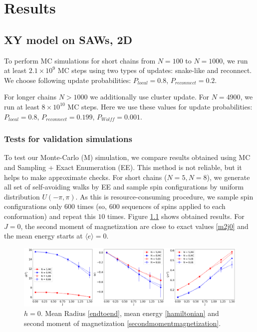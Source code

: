 \chapter{Results} \label{ch:results}
 
\section{XY model on SAWs, 2D}
To perform MC simulations for short chains from $N=100$ to $N=1000$, we run at least $2.1 \times 10^9$ MC steps using two  types of updates: snake-like and reconnect. We choose following update probabilities: $P_{local}=0.8$, $P_{reconnect}=0.2$. 

For longer chains $N>1000$ we additionally use cluster update. For $N=4900$, we run at least $8 \times 10^{10} $ MC steps. Here we use these values for update probabilities: $P_{local}=0.8$, $P_{reconnect}=0.199$, $P_{Wolff}=0.001$.

 
\subsection{Tests for validation simulations}
To test our Monte-Carlo (M) simulation, we compare results obtained using MC and Sampling + Exact Enumeration (EE). This method is not reliable, but it helps to make approximate checks. For short chains ($N=5, N=8$), we generate all set of self-avoiding walks by EE and sample spin configurations by uniform distribution $U(-\pi, \pi)$. As this is resource-consuming procedure, we sample spin configurations only $600$ times (so, 600 sequences of spins applied to each conformation) and repeat this $10$ times. Figure \ref{fig:ee} shows obtained results.  For $J=0$, the second moment of magnetization are close to exact values \eqref{m2j0} and the mean energy starts at $\langle e \rangle = 0$.

 \begin{figure}[H]
	\centering
	\includegraphics[scale=0.26]{Images/EE.png}
	\caption{$h=0$. Mean Radius \eqref{endtoend}, mean energy \eqref{hamiltonian} and   second moment of magnetization \eqref{secondmomentmagnetization}.   }
	\label{fig:ee}
\end{figure}


